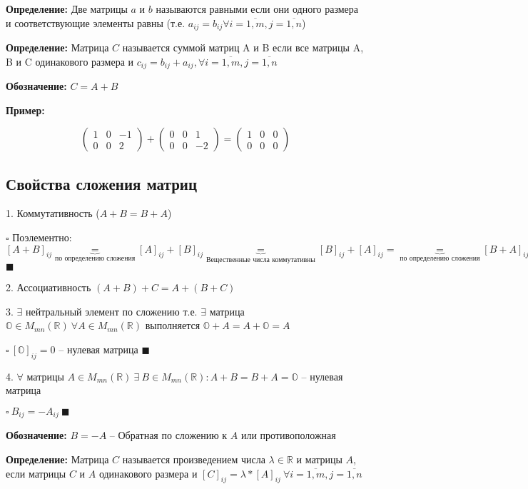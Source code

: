 \documentclass[a4paper,12pt]{article}
\begin{document}
	{\bf Определение: } Две матрицы $a$ и $b$ называются равными если они одного размера и соответствующие элементы равны (т.е. $a_{ij}=b_{ij} \forall i=\overline{1, m}, j=\overline{1, n}$)

	{\bf Определение: } Матрица $C$ называется суммой матриц A и B если все матрицы A, B и C одинакового размера и $c_{ij}=b_{ij}+a_{ij}, \forall i=\overline{1,m}, j=\overline{1,n}$

	{\bf Обозначение: } $C = A + B$

	{\bf Пример: }

	\[
		\begin{pmatrix} 
			1 & 0 & -1 \\
			0 & 0 & 2
		\end{pmatrix}
		+
		\begin{pmatrix} 
			0 & 0 & 1 \\
			0 & 0 & -2
		\end{pmatrix}
		=
		\begin{pmatrix} 
			1 & 0 & 0 \\
			0 & 0 & 0
		\end{pmatrix}
	\]

	\subsection{Свойства сложения матриц}

	1. Коммутативность ($A + B = B + A$)

	$\square$ Поэлементно: $[A+B]_{ij} \underbrace{=}_{\text{по определению сложения}} [A]_{ij}+[B]_{ij} \underbrace{=}_{\text{Вещественные числа коммутативны}} [B]_{ij}+[A]_{ij} = \underbrace{=}_{\text{по определению сложения}} [B+A]_{ij}$ $\blacksquare$

	2. Ассоциативность $(A + B) + C = A + (B + C)$

	3. $\exists$ нейтральный элемент по сложению т.е. $\exists$ матрица $\mathbb{O} \in M_{mn}(\mathbb R)~\forall A \in M_{mn}(\mathbb R)$ выполняется $\mathbb O + A = A + \mathbb O = A$

	$\square~[\mathbb O]_{ij} = 0$ -- нулевая матрица $\blacksquare$

	4. $\forall$ матрицы $A \in M_{mn}(\mathbb R)~\exists~B \in M_{mn}(\mathbb R): A + B = B + A = \mathbb O$ -- нулевая матрица
	
	$\square~B_{ij} = -A_{ij}~\blacksquare$

	{\bf Обозначение: } $B = -A$ -- Обратная по сложению к $A$ или противоположная

	{\bf Определение: } Матрица $C$ называется произведением числа $\lambda \in \mathbb R$ и матрицы $A$, если матрицы $C$ и $A$ одинакового размера и $[C]_{ij} = \lambda * [A]_{ij}~\forall i = \overline{1,m}, j = \overline{1,n}$
\end{document}
